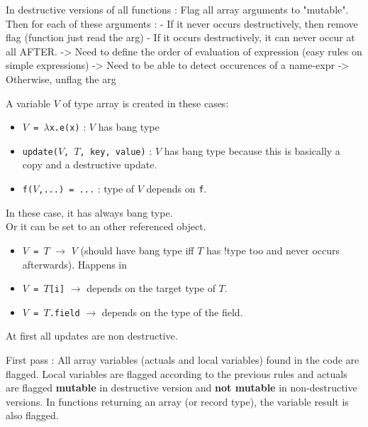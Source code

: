 \documentclass[12pt,a4paper,titlepage]{article}
\newcommand{\cl}[1]{\texttt{#1}}
\begin{document}
In destructive versions of all functions :
Flag all array arguments to "mutable".
Then for each of these arguments :
  - If it never occurs destructively, then remove flag
          (function just read the arg)
  - If it occurs destructively, it can never occur at all AFTER.
  -> Need to define the order of evaluation of expression
      (easy rules on simple expressions)
  -> Need to be able to detect occurences of a name-expr
  -> Otherwise, unflag the arg

A variable $V$ of type array is created in these cases:
\begin{itemize}
\item \cl{$V$ = $\lambda$x.e(x)} : $V$ has bang type
\item \cl{update($V$, $T$, key, value)} : $V$ has bang type because this is basically a copy and a destructive update.
\item \cl{f($V$,...) = ...} : type of $V$ depends on \cl{f}.
\end{itemize}
In these case, it has always bang type.\\
Or it can be set to an other referenced object.
\begin{itemize}
\item \cl{$V$ = $T$} $\rightarrow$ $V$ (should have bang type iff $T$ has !type too and never occurs afterwards). Happens in 
\item \cl{$V$ = $T$[i]} $\rightarrow$ depends on the target type of $T$.
\item \cl{$V$ = $T$.field} $\rightarrow$ depends on the type of the field.
\end{itemize}
At first all updates are non destructive.

First pass : All array variables (actuals and local variables) found in the code are flagged. Local variables are flagged according to the previous rules and actuals are flagged \textbf{mutable} in destructive version and \textbf{not mutable} in non-destructive versions. In functions returning an array (or record type), the variable result is also flagged.\\
\end{document}
